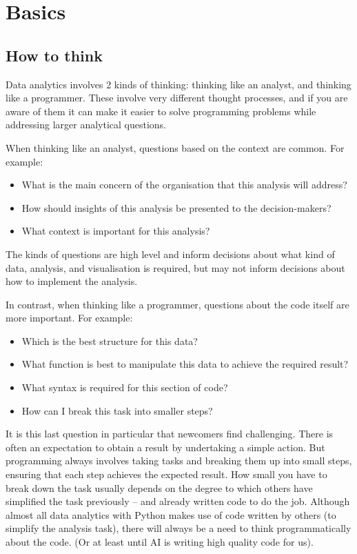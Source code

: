 \chapter{Basics}
\label{chapter:basics}

\section{How to think}

Data analytics involves 2 kinds of thinking: thinking like an analyst, and thinking like a programmer. These involve very different thought processes, and if you are aware of them it can make it easier to solve programming problems while addressing larger analytical questions.

When thinking like an analyst, questions based on the context are common. For example:

\begin{itemize}
    \item What is the main concern of the organisation that this analysis will address?
    \item How should insights of this analysis be presented to the decision-makers?
    \item What context is important for this analysis?
\end{itemize}

The kinds of questions are high level and inform decisions about what kind of data, analysis, and visualisation is required, but may not inform decisions about how to implement the analysis.

In contrast, when thinking like a programmer, questions about the code itself are more important. For example:
\begin{itemize}
    \item Which is the best structure for this data?
    \item What function is best to manipulate this data to achieve the required result?
    \item What syntax is required for this section of code?
    \item How can I break this task into smaller steps?
\end{itemize}

It is this last question in particular that newcomers find challenging. There is often an expectation to obtain a result by undertaking a simple action. But programming always involves taking tasks and breaking them up into small steps, ensuring that each step achieves the expected result.
How small you have to break down the task usually depends on the degree to which others have simplified the task previously -- and already written code to do the job. Although almost all data analytics with Python makes use of code written by others (to simplify the analysis task), there will always be a need to think programmatically about the code. (Or at least until AI is writing high quality code for us).

